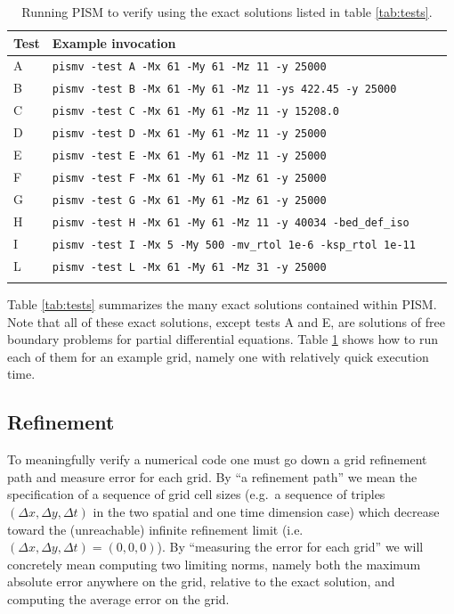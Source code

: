 \documentclass[11pt,final]{amsart}
\begin{document}
\begin{table}[h]
\caption{Running PISM to verify using the exact solutions listed in table \ref{tab:tests}.}\label{tab:tests_exec}
\small
\begin{tabular}{@{}llll}\hline
\textbf{Test} & \textbf{Example invocation}  \\ \hline
A & \verb|pismv -test A -Mx 61 -My 61 -Mz 11 -y 25000| \\
B & \verb|pismv -test B -Mx 61 -My 61 -Mz 11 -ys 422.45 -y 25000|  \\
C & \verb|pismv -test C -Mx 61 -My 61 -Mz 11 -y 15208.0|  \\
D & \verb|pismv -test D -Mx 61 -My 61 -Mz 11 -y 25000|  \\
E & \verb|pismv -test E -Mx 61 -My 61 -Mz 11 -y 25000|  \\
F & \verb|pismv -test F -Mx 61 -My 61 -Mz 61 -y 25000|  \\
G & \verb|pismv -test G -Mx 61 -My 61 -Mz 61 -y 25000|  \\
H & \verb|pismv -test H -Mx 61 -My 61 -Mz 11 -y 40034 -bed_def_iso| \\
I & \verb|pismv -test I -Mx 5 -My 500 -mv_rtol 1e-6 -ksp_rtol 1e-11| \\
L & \verb|pismv -test L -Mx 61 -My 61 -Mz 31 -y 25000| \\
\hline
\normalsize
\end{tabular}
\end{table}

Table \ref{tab:tests} summarizes the many exact solutions contained within PISM.  Note that all of these exact solutions, except tests A and E, are solutions of free boundary problems for partial differential equations.  Table \ref{tab:tests_exec} shows how to run each of them for an example grid, namely one with relatively quick execution time.

\subsection{Refinement}  To meaningfully verify a numerical code one must go down a grid refinement path and measure error for each grid.  By ``a refinement path'' we mean the specification of a sequence of grid cell sizes (e.g.~a sequence of triples $(\Delta x,\Delta y,\Delta t)$ in the two spatial and one time dimension case) which decrease toward the (unreachable) infinite refinement limit (i.e.~$(\Delta x,\Delta y,\Delta t) = (0,0,0)$).  By ``measuring the error for each grid'' we will concretely mean computing two limiting norms, namely both the maximum absolute error anywhere on the grid, relative to the exact solution, and computing the average error on the grid.
\end{document}
